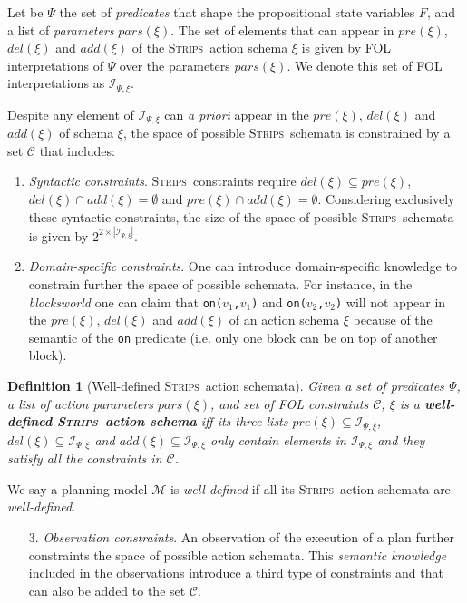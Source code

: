 \documentclass{article}
\newcommand{\strips}{\textsc{Strips}}
\newtheorem{definition}[theorem]{Definition}
\begin{document}
Let be $\Psi$ the set of {\em predicates} that shape the propositional state variables $F$, and a list of {\em parameters} $pars(\xi)$. The set of elements that can appear in $pre(\xi)$, $del(\xi)$ and $add(\xi)$ of the \strips\ action schema $\xi$ is given by FOL interpretations of $\Psi$ over the parameters $pars(\xi)$. We denote this set of FOL interpretations as ${\mathcal I}_{\Psi,\xi}$. 

Despite any element of ${\mathcal I}_{\Psi,\xi}$ can {\em a priori} appear in the $pre(\xi)$, $del(\xi)$ and $add(\xi)$ of schema $\xi$, the space of possible \strips\ schemata is constrained by a set ${\mathcal C}$ that includes:

\begin{enumerate}
\item {\em Syntactic constraints}. \strips\ constraints require $del(\xi)\subseteq pre(\xi)$, $del(\xi)\cap add(\xi)=\emptyset$ and $pre(\xi)\cap add(\xi)=\emptyset$. Considering exclusively these syntactic constraints, the size of the space of possible \strips\ schemata is given by $2^{2\times|{\mathcal I}_{\Psi,\xi}|}$. 

\item {\em Domain-specific constraints}. One can introduce domain-specific knowledge to constrain further the space of possible schemata. For instance, in the {\em blocksworld} one can claim that {\small\tt on($v_1$,$v_1$)} and {\small\tt on($v_2$,$v_2$)} will not appear in the $pre(\xi)$, $del(\xi)$ and $add(\xi)$ of an action schema $\xi$ because of the semantic of the {\tt\small on} predicate (i.e. only one block can be on top of another block). 
\end{enumerate}

\begin{definition}[Well-defined \strips\ action schemata]
Given a set of {\em predicates} $\Psi$, a list of action {\em parameters} $pars(\xi)$, and set of FOL constraints ${\mathcal C}$, $\xi$ is a {\bf well-defined \strips\ action schema} iff its three lists $pre(\xi)\subseteq {\mathcal I}_{\Psi,\xi}$, $del(\xi)\subseteq{\mathcal I}_{\Psi,\xi}$ and $add(\xi)\subseteq{\mathcal I}_{\Psi,\xi}$ only contain elements in ${\mathcal I}_{\Psi,\xi}$ and they satisfy all the constraints in ${\mathcal C}$.
\end{definition}

We say a planning model $\mathcal{M}$ is {\em well-defined} if all its \strips\ action schemata are {\em well-defined}.

\begin{enumerate}
\item[3.] {\em Observation constraints}. An observation of the execution of a plan further constraints the space of possible action schemata. This \emph{semantic knowledge} included in the observations introduce a third type of constraints and that can also be added to the set $\mathcal{C}$.
\end{enumerate}
\end{document}
